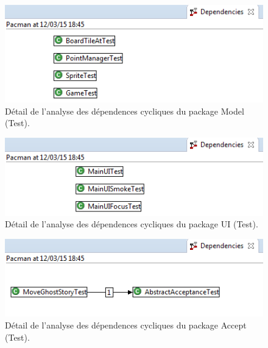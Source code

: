 \documentclass[12pt,a4paper,final]{article}
\begin{document}
\begin{figure}
	\centering
	\includegraphics[width=\textwidth]{images/DependenciesModelTest.png}
	\caption{\label{deadcode}Détail de l'analyse des dépendences cycliques du package Model (Test).}
\end{figure}

\begin{figure}
	\centering
	\includegraphics[width=\textwidth]{images/DependenciesUITest.png}
	\caption{\label{deadcode}Détail de l'analyse des dépendences cycliques du package UI (Test).}
\end{figure}

\begin{figure}
	\centering
	\includegraphics[width=\textwidth]{images/DependenciesAcceptTest.png}
	\caption{\label{deadcode}Détail de l'analyse des dépendences cycliques du package Accept (Test).}
\end{figure}
\end{document}
